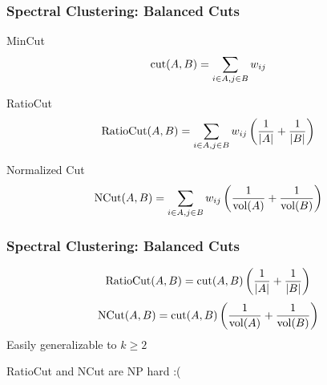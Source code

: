 \documentclass{beamer}
\begin{document}
\begin{frame}
\frametitle{Spectral Clustering: Balanced Cuts}
\vspace{-1.5em}
\begin{flushright}
\end{flushright}
\vspace{-1em}
\pause
\begin{block}{MinCut}
\[{\rm cut}(A,B)= \sum_{i\in A, j\in B} w_{ij}\]
\end{block}

\pause

\begin{block}{RatioCut}
\[{\rm RatioCut}(A,B)= \sum_{i\in A, j\in B} w_{ij} \left( \frac{1}{|A|} + \frac{1}{|B|} \right) \]
\end{block}

\pause


\begin{block}{Normalized Cut}
\[{\rm NCut}(A,B)= \sum_{i\in A, j\in B} w_{ij} \left( \frac{1}{{\rm vol}(A)} + \frac{1}{{\rm vol}(B)} \right) \]
\end{block}

\end{frame}
\begin{frame}
\frametitle{Spectral Clustering: Balanced Cuts}

\[{\rm RatioCut}(A,B)=  {\rm cut}(A,B) \left( \frac{1}{|A|} + \frac{1}{|B|} \right) \]
\[{\rm NCut}(A,B)= {\rm cut}(A,B) \left( \frac{1}{{\rm vol}(A)} + \frac{1}{{\rm vol}(B)} \right) \]
\bigskip
Easily generalizable to $k \geq 2$
\pause
\medskip
\begin{center}
 \pause 
RatioCut and NCut are NP hard :( 
\pause 
\bigskip
\bigskip
{}
\end{center}

\end{frame}


\MakeLastSlide
\end{document}
